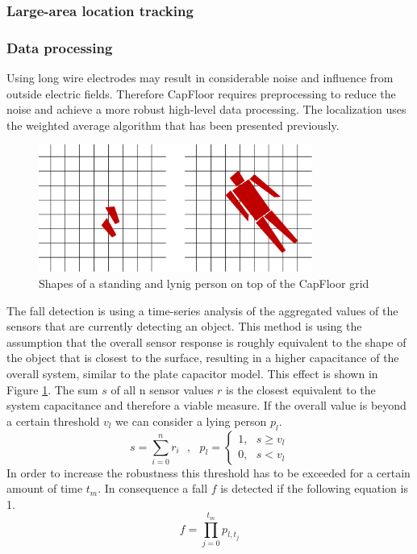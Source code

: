 \subsubsection{Large-area location tracking}
\subsubsection{Data processing}
Using long wire electrodes may result in considerable noise and influence from outside electric fields. Therefore CapFloor requires preprocessing to reduce the noise and achieve a more robust high-level data processing. The localization uses the weighted average algorithm that has been presented previously. 
\begin{figure}[h]
\centering
\includegraphics[width=0.8\textwidth]{images/floor_shapes}
\caption{Shapes of a standing and lynig person on top of the CapFloor grid}
\label{fig:capfloor_shapes}
\end{figure}
The fall detection is using a time-series analysis of the aggregated values of the sensors that are currently detecting an object. This method is using the assumption that the overall sensor response is roughly equivalent to the shape of the object that is closest to the surface, resulting in a higher capacitance of the overall system, similar to the plate capacitor model. This effect is shown in Figure \ref{fig:capfloor_shapes}. The sum $s$ of all n sensor values $r$ is the closest equivalent to the system capacitance and therefore a viable measure. If the overall value is beyond a certain threshold $v_l$ we can consider a lying person $p_l$.
\begin{equation}
s=\sum^n_{i=0}{r_i}\ \ \ ,\ \ \ p_l=\left\{ \begin{array}{c}
1,\ \ \ s\ge v_l \\ 
0,\ \ \ s<v_l \end{array}
\right.
\end{equation}
In order to increase the robustness this threshold has to be exceeded for a certain amount of time $t_m$. In consequence a fall $f$ is detected if the following equation is 1.
\begin{equation}
f=\prod^{t_m}_{j=0}{p_{l,t_j}}
\end{equation}
